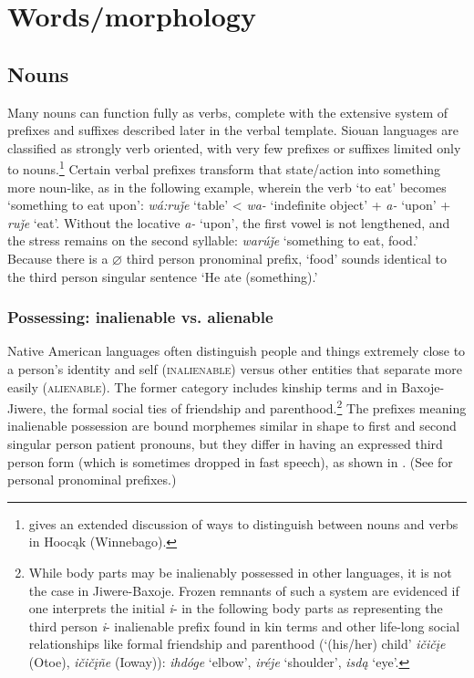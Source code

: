 \documentclass[output=paper]{LSP/langsci}
\begin{document}
\section{Words/morphology}
\subsection{Nouns}   Many nouns can function fully as verbs, complete with the extensive system of prefixes and suffixes described later in the verbal template. Siouan languages are classified as strongly verb oriented, with very few prefixes or suffixes limited only to nouns.\footnote{\citet{Helmbrecht2002} gives an extended discussion of ways to distinguish between nouns and verbs in Hooc\k{a}k (Winnebago).} Certain verbal prefixes transform that state/action into something more noun-like, as in the following example, wherein the verb `to eat' becomes `something to eat upon':  \textit{wá:ru\v{j}e} `table' < \textit{wa-} `indefinite object' + \textit{a-} `upon' + \textit{ru\v{j}e} `eat'. Without the locative \textit{a-} `upon', the first vowel is not lengthened, and the stress remains on the second syllable: \textit{warú\v{j}e} `something to eat, food.'  Because there is a $\varnothing$ third person pronominal prefix, `food' sounds identical to the third person singular sentence `He ate (something).'

\subsubsection{Possessing: inalienable vs. alienable}  Native American languages often distinguish people and things extremely close to a person's identity and self (\textsc{inalienable}) versus other entities that separate more easily (\textsc{alienable}). The former category includes kinship terms and in Baxoje-Jiwere, the formal social ties of friendship and parenthood.\footnote{While body parts may be inalienably possessed in other languages, it is not the case in Jiwere-Baxoje. Frozen remnants of such a system are evidenced if one interprets the initial \textit{i}- in the following body parts as representing the third person \textit{i}- inalienable prefix found in kin terms and other life-long social relationships like formal friendship and parenthood (`(his/her) child' \textit{i\v{c}i\v{c}\k{i}e} (Otoe), \textit{i\v{c}i\v{c}\k{i}\~ne} (Ioway)): \textit{ihd\'oge} `elbow', \textit{ir\'eje} `shoulder', \textit{isd\k{a}} `eye'.} The prefixes meaning inalienable possession are bound morphemes similar in shape to first and second singular person patient  pronouns, but they differ in having an expressed third person form (which is sometimes dropped in fast speech), as shown in . (See  for personal pronominal prefixes.)
\end{document}
